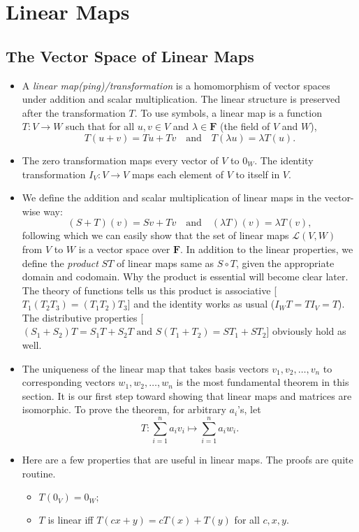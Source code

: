 \documentclass[11pt]{article}
\newcommand{\df}[1]{\textit{\textsf{#1}}}
\newcommand{\F}{\mathbf{F}}
\begin{document}
\newpage
\section{Linear Maps}
\subsection{The Vector Space of Linear Maps}
\begin{itemize}
    \item A \df{linear map(ping)/transformation} is a homomorphism of vector spaces under addition and scalar multiplication. The linear structure is preserved after the transformation $T$. To use symbols, a linear map is a function $T: V \rightarrow W$ such that for all $u,v \in V$ and $\lambda \in \F$ (the field of $V$ and $W$),
    \begin{equation*}
        T(u+v) = Tu + Tv \quad \text{and} \quad
        T (\lambda u) = \lambda T(u).
    \end{equation*}
    \item The zero transformation maps every vector of $V$ to $0_W$. The identity transformation $I_V: V \rightarrow V$ maps each element of $V$ to itself in $V$.
    \item We define the addition and scalar multiplication of linear maps in the vector-wise way: $$(S+T)(v) = Sv + Tv \quad \text{and} \quad (\lambda T)(v) = \lambda T(v),$$ following which we can easily show that the set of linear maps $\mathcal{L}(V,W)$ from $V$ to $W$ is a vector space over $\F$. In addition to the linear properties, we define the \df{product} $ST$ of linear maps same as $S \circ T$, given the appropriate domain and codomain. Why the product is essential will become clear later. The theory of functions tells us this product is associative [$T_1(T_2 T_3) = (T_1 T_2) T_3$] and the identity works as usual ($I_W T = T I_V = T$). The distributive properties [$(S_1 + S_2) T = S_1 T + S_2 T \text{ and } S(T_1 + T_2) = S T_1 + S T_2$] obviously hold as well.
    \item The uniqueness of the linear map that takes basis vectors $v_1, v_2, \dots, v_n$ to corresponding vectors $w_1, w_2, \dots, w_n$ is the most fundamental theorem in this section. It is our first step toward showing that linear maps and matrices are isomorphic. To prove the theorem, for arbitrary $a_i$'s, let $$T: \sum_{i=1}^n a_i v_i \mapsto \sum_{i=1}^n a_i w_i.$$
    \item Here are a few properties that are useful in linear maps. The proofs are quite routine.
    \begin{itemize}
        \item $T(0_V) = 0_W;$
        \item $T$ is linear iff $T(cx+y) = cT(x) + T(y)$ for all $c,x,y.$
    \end{itemize}
\end{itemize}
\end{document}
